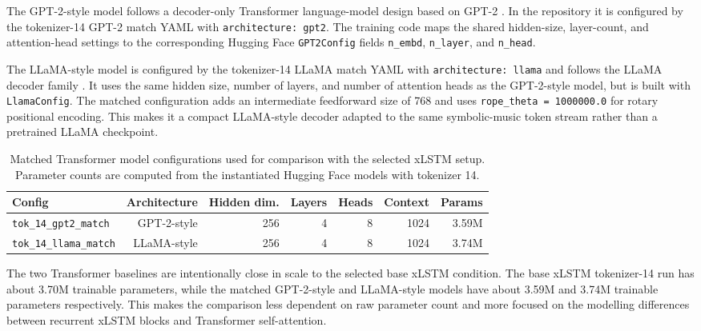 The GPT-2-style model follows a decoder-only Transformer language-model design
based on GPT-2 \citep{radfordLanguageModelsAre}. In the repository it is
configured by the tokenizer-14 GPT-2 match YAML with \verb|architecture: gpt2|.
The training code maps the shared hidden-size, layer-count, and attention-head
settings to the corresponding Hugging Face \verb|GPT2Config| fields
\verb|n_embd|, \verb|n_layer|, and \verb|n_head|.

The LLaMA-style model is configured by the tokenizer-14 LLaMA match YAML with
\verb|architecture: llama| and follows the LLaMA decoder family
\citep{touvronLLaMAOpenEfficient2023}. It uses the same hidden size, number of
layers, and number of attention heads as the GPT-2-style model, but is built
with \verb|LlamaConfig|. The matched configuration adds an intermediate
feedforward size of 768 and uses \verb|rope_theta = 1000000.0| for rotary
positional encoding. This makes it a compact LLaMA-style decoder adapted to the
same symbolic-music token stream rather than a pretrained LLaMA checkpoint.

\begin{table}[htbp]
	\centering
	\begin{tabular}{lrrrrrr}
		\toprule
		Config & Architecture & Hidden dim. & Layers & Heads & Context & Params \\
		\midrule
		\verb|tok_14_gpt2_match|  & GPT-2-style  & 256 & 4 & 8 & 1024 & 3.59M \\
		\verb|tok_14_llama_match| & LLaMA-style  & 256 & 4 & 8 & 1024 & 3.74M \\
		\bottomrule
	\end{tabular}
	\caption{Matched Transformer model configurations used for comparison with the selected xLSTM setup. Parameter counts are computed from the instantiated Hugging Face models with tokenizer 14.}
	\label{tab:transformer_model_configs}
\end{table}

The two Transformer baselines are intentionally close in scale to the selected
base xLSTM condition. The base xLSTM tokenizer-14 run has about 3.70M trainable
parameters, while the matched GPT-2-style and LLaMA-style models have about
3.59M and 3.74M trainable parameters respectively. This makes the comparison
less dependent on raw parameter count and more focused on the modelling
differences between recurrent xLSTM blocks and Transformer self-attention.
